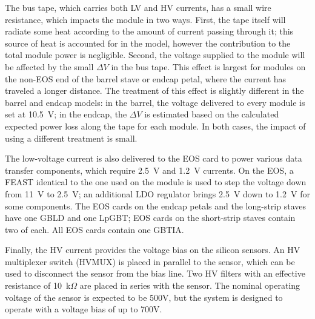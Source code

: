The bus tape, which carries both LV and HV currents, has a small wire resistance, which impacts the
module in two ways. First,
the tape itself will radiate some heat according to the amount of current passing through it; this
source of heat is accounted for in the model, however the contribution to the total module power
is negligible.
Second,
the voltage supplied to the module will be affected by the small $\Delta V$ in the bus tape. This
effect is largest for modules on the non-EOS end of the barrel stave or endcap petal, where the current
has traveled a longer distance. The treatment of this effect is slightly different in the barrel and
endcap models: in the barrel, the voltage delivered to every module is set at 10.5~V; in the endcap,
the $\Delta V$ is estimated based on the calculated expected power loss along the tape for each module.
In both cases, the impact of using a different treatment is small.

The low-voltage current is also delivered to the EOS card to power various data transfer components,
which require 2.5~V and 1.2~V currents.
On the EOS, a FEAST identical to the one used on the module is used to step the voltage down from 11~V
to 2.5~V; an additional LDO regulator brings  2.5~V down to 1.2~V for some components.
The EOS cards on the endcap petals and the long-strip staves have one GBLD and one LpGBT;
EOS cards on the short-strip staves contain two of each. All EOS cards contain one GBTIA.

Finally, the HV current provides the voltage bias on the silicon sensors. An HV multiplexer
switch (HVMUX) is placed in parallel to the sensor, which can be used to disconnect the sensor from the
bias line. Two HV filters with an effective resistance of 10~k$\Omega$ are placed in series with the
sensor. The nominal operating voltage of the sensor is expected to be 500V, but the system is designed
to operate with a voltage bias of up to 700V.

